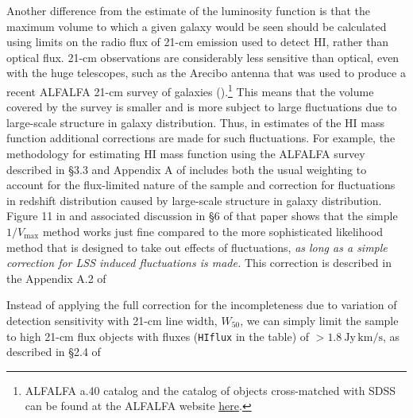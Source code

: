 Another difference from the estimate of the luminosity function is that the maximum volume to which a given galaxy would be seen should be calculated using limits on the radio flux of 21-cm emission used to detect HI, rather than optical flux. 21-cm observations are considerably less sensitive than optical, even with the huge telescopes, such as the Arecibo antenna that was used to produce a recent ALFALFA 21-cm survey of galaxies (\href{http://adsabs.harvard.edu/abs/2011AJ....142..170H}{\citealt{haynes_etal11}}).\footnote{ALFALFA a.40 catalog and the catalog of objects cross-matched with SDSS can be found at the ALFALFA website \href{http://egg.astro.cornell.edu/alfalfa/data/a40files/}{\underline{here}}.} This means that the volume covered by the survey is smaller and is more subject to large fluctuations due to large-scale structure in galaxy distribution. Thus, in estimates of the HI mass function additional corrections are made for such fluctuations. For example, the methodology for estimating HI mass function using the ALFALFA survey described in \S 3.3 and Appendix A of \href{http://adsabs.harvard.edu/abs/2010ApJ...723.1359M}{\citet{martin_etal10}} includes both the usual weighting to account for the flux-limited nature of the sample and correction for fluctuations in redshift distribution caused by large-scale structure in galaxy distribution.
Figure 11 in \href{http://adsabs.harvard.edu/abs/2010ApJ...723.1359M}{\citet{martin_etal10}} and associated discussion in \S 6 of that paper shows that the simple $1/V_{\mathrm{max}}$ method works just fine compared to the more sophisticated likelihood method that is designed to take out effects of fluctuations, {\it as long as a simple correction for LSS induced fluctuations is made.} This correction is described in the Appendix A.2 of \href{http://adsabs.harvard.edu/abs/2010ApJ...723.1359M}{\citet{martin_etal10}}

Instead of applying the full correction for the incompleteness due to variation of detection sensitivity with 21-cm line width, $W_{50}$, we can simply limit the sample to high 21-cm flux objects with fluxes ({\tt HIflux} in the table) of $>1.8\ \mathrm{Jy\, km/s}$, as described in \S 2.4 of \href{http://adsabs.harvard.edu/abs/2010ApJ...723.1359M}{\citet{martin_etal10}}

